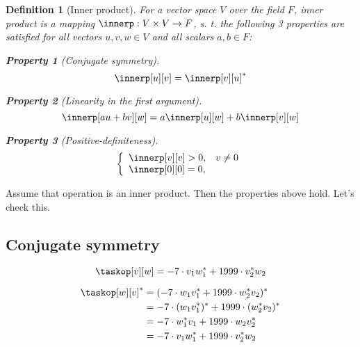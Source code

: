 \documentclass[a4paper]{article}
\theoremstyle{break}
\newtheorem{definition}{Definition}[section]
\theoremstyle{break}
\newtheorem{property}{Property}[section]
\begin{document}
\begin{definition}[Inner product]
  For a vector space $V$ over the field $F$, inner product is a mapping $\innerp: V \times V \rightarrow F$, s. t. the following 3 properties are satisfied for all vectors $u, v, w \in V$ and all scalars $a, b \in F$:

  \begin{property}[Conjugate symmetry] \label{prop:conj_sym}
    $$\innerp[u][v] = \innerp[v][u]^*$$
  \end{property}

  \begin{property}[Linearity in the first argument] \label{prop:liearity}
    $$\innerp[au + bv][w] = a\innerp[u][w] + b\innerp[v][w]$$
  \end{property}

  \begin{property}[Positive-definiteness] \label{prop:pos-def}
    $$
    \left\{
      \begin{array}{ll}
        \innerp[v][v] > 0, & v \neq 0 \\
        \innerp[0][0] = 0, & 
      \end{array}
    \right.
    $$
  \end{property}

\end{definition}

Assume that operation \taskop is an inner product. Then the properties above hold. Let's check this.

\subsection{Conjugate symmetry}

\begin{equation} \label{eqn:task1_source_eq}
  \taskop[v][w] = -7 \cdot v_1w_1^* + 1999 \cdot v_2^*w_2
\end{equation}

\begin{equation} \label{eqn:task1_eq_conjugation}
  \begin{split}
    \taskop[w][v]^*
      &= (-7 \cdot w_1v_1^* + 1999 \cdot w_2^*v_2)^* \\
      &= -7 \cdot (w_1v_1^*)^* + 1999 \cdot (w_2^*v_2)^* \\
      &= -7 \cdot w_1^*v_1 + 1999 \cdot w_2v_2^* \\
      &= -7 \cdot v_1w_1^* + 1999 \cdot v_2^*w_2 \\
  \end{split}
\end{equation}
\end{document}
